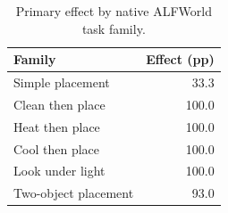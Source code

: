 \begin{table}[t]
\centering
\caption{Primary effect by native ALFWorld task family.}
\label{tab:family}
\begin{tabular}{lr}
\toprule
Family & Effect (pp) \\
\midrule
Simple placement & 33.3 \\
Clean then place & 100.0 \\
Heat then place & 100.0 \\
Cool then place & 100.0 \\
Look under light & 100.0 \\
Two-object placement & 93.0 \\
\bottomrule
\end{tabular}
\end{table}
